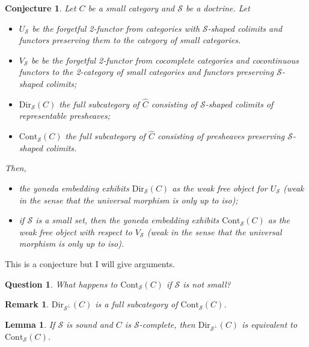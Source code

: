 \documentclass{article}
\newcommand{\Cont}[1]{\text{Cont}_{#1}}
\newcommand{\Dir}[1]{\text{Dir}_{#1}}
\newcommand{\Set}{\text{Set}}
\newtheorem{conjecture}[theorem]{Conjecture}
\newtheorem{question}[theorem]{Question}
\newtheorem{remark}[theorem]{Remark}
\newtheorem{lemma}[theorem]{Lemma}
\begin{document}
\begin{conjecture}
  Let $C$ be a small category and
  $\mathcal{S}$ be a doctrine.
  Let
  \begin{itemize}
  \item $U_\mathcal{S}$ be the forgetful 2-functor from categories with $\mathcal{S}$-shaped colimits
    and functors preserving them to the category of small categories.
    \item $V_\mathcal{S}$ be
     be the forgetful 2-functor from cocomplete categories and cocontinuous
     functors to the 2-category of small categories and functors preserving $\mathcal{S}$-shaped
colimits;
\item $\Dir{\mathcal{S}}(C)$ the full subcategory of $\hat{C}$ consisting of
  $\mathcal{S}$-shaped colimits of representable presheaves;
\item $\Cont{\mathcal{S}}(C)$ the full subcategory of $\hat{C}$ consisting of
  presheaves preserving $\mathcal{S}$-shaped colimits.
  \end{itemize}
  Then,
  \begin{itemize}
  \item 
    the yoneda embedding exhibits $\Dir{\mathcal{S}}(C)$ as the weak free
    object for $U_\mathcal{S}$
    (weak in the sense that
    the universal morphism is only up to iso);
    \item
      if $\mathcal{S}$ is a small set, then 
      the yoneda embedding exhibits  $\Cont{\mathcal{S}}(C)$ as the
      weak free object with respect to $V_\mathcal{S}$ (weak in the sense that
      the universal morphism is only up to iso).
  \end{itemize}
\end{conjecture}
This is a conjecture but I will give arguments.
\begin{question}
What happens to $\Cont{\mathcal{S}}(C)$ if $\mathcal{S}$ is not small?
\end{question}
\begin{remark}
  $\Dir{\mathcal{S}^\bot}(C)$  is a full subcategory of $\Cont{\mathcal{S}}(C)$.
\end{remark}
\begin{lemma}
  If $\mathcal{S}$ is sound and $C$ is $\mathcal{S}$-complete, then
  $\Dir{\mathcal{S}^\bot}(C)$ is equivalent to $\Cont{\mathcal{S}}(C)$.
\end{lemma}
\end{document}
